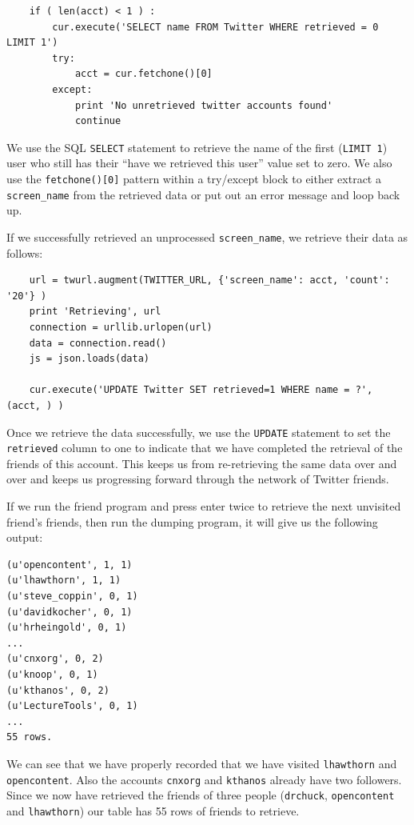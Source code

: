 \documentclass[11pt]{book}
\begin{document}
\beforeverb
\begin{verbatim}
    if ( len(acct) < 1 ) :
        cur.execute('SELECT name FROM Twitter WHERE retrieved = 0 LIMIT 1')
        try:
            acct = cur.fetchone()[0]
        except:
            print 'No unretrieved twitter accounts found'
            continue
\end{verbatim}
\afterverb
%
We use the SQL {\tt SELECT} statement to retrieve the name of the first 
({\tt LIMIT 1}) user who still has their ``have we retrieved this user''
value set to zero.  We also use the {\tt fetchone()[0]} pattern within 
a try/except block to either extract a \verb"screen_name" from the retrieved
data or put out an error message and loop back up.

If we successfully retrieved an unprocessed \verb"screen_name", we retrieve
their data as follows:

\beforeverb
\begin{verbatim}
    url = twurl.augment(TWITTER_URL, {'screen_name': acct, 'count': '20'} )
    print 'Retrieving', url
    connection = urllib.urlopen(url)
    data = connection.read()
    js = json.loads(data)

    cur.execute('UPDATE Twitter SET retrieved=1 WHERE name = ?', (acct, ) )
\end{verbatim}
\afterverb
%
Once we retrieve the data successfully, we use the {\tt UPDATE} statement 
to set the {\tt retrieved} column to one to indicate that we have completed 
the retrieval of the friends of this account.  This keeps us from re-retrieving
the same data over and over and keeps us progressing forward through the network
of Twitter friends.

If we run the friend program and press enter twice to retrieve the next 
unvisited friend's friends,
then run the dumping program, it will give us the following output:

\beforeverb
\begin{verbatim}
(u'opencontent', 1, 1)
(u'lhawthorn', 1, 1)
(u'steve_coppin', 0, 1)
(u'davidkocher', 0, 1)
(u'hrheingold', 0, 1)
...
(u'cnxorg', 0, 2)
(u'knoop', 0, 1)
(u'kthanos', 0, 2)
(u'LectureTools', 0, 1)
...
55 rows.
\end{verbatim}
\afterverb
%
We can see that we have properly recorded that we have visited 
{\tt lhawthorn} and {\tt opencontent}.  Also the accounts 
{\tt cnxorg} and {\tt kthanos} already have two followers.
Since we now have retrieved the friends of three people
({\tt drchuck}, {\tt opencontent} and {\tt lhawthorn}) our table has 55 rows 
of friends to retrieve.
\end{document}
